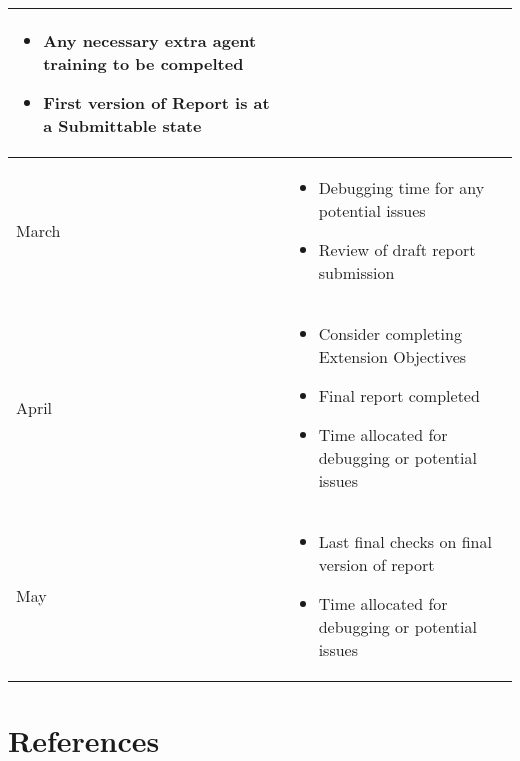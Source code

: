 \documentclass{surrey_disso_style}
\begin{document}
\begin{center}
\begin{tabular}{|p{1.6cm}|p{13cm}|}
\begin{itemize}
      \item Any necessary extra agent training to be compelted
      \item First version of Report is at a Submittable state
   \end{itemize}\\
   \hline
   March & \begin{itemize}
      \item Debugging time for any potential issues 
      \item Review of draft report submission
   \end{itemize}\\
   \hline
   April & \begin{itemize}
      \item Consider completing Extension Objectives
      \item Final report completed 
      \item Time allocated for debugging or potential issues
   \end{itemize}\\
   \hline
   May & \begin{itemize}
      \item Last final checks on final version of report
      \item Time allocated for debugging or potential issues
   \end{itemize}\\
   \hline

\end{tabular}
\end{center}

\newpage


%
%

\section{References}
\printbibliography[heading=none]
\end{document}
